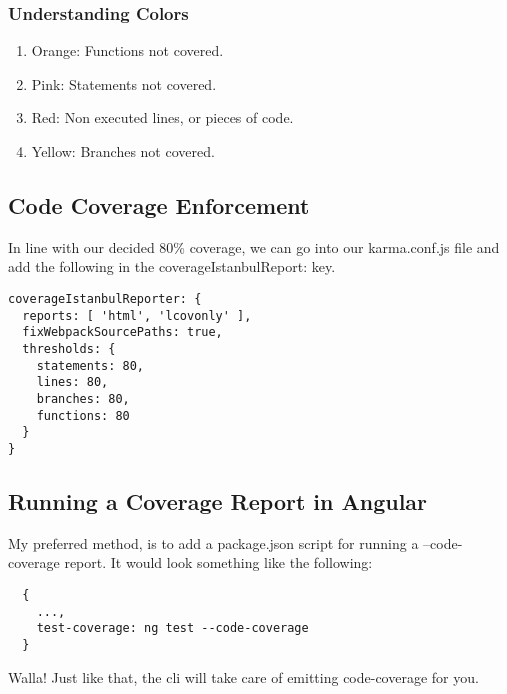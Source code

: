 \subsubsection{Understanding Colors}
\begin{enumerate}
  \item Orange: Functions not covered.
  \item Pink: Statements not covered.
  \item Red: Non executed lines, or pieces of code.
  \item Yellow: Branches not covered.
\end{enumerate}

\subsection{ Code Coverage Enforcement }
In line with our decided 80\% coverage, we can go into our karma.conf.js file
and add the following in the coverageIstanbulReport: key.
\begin{lstlisting}
coverageIstanbulReporter: {
  reports: [ 'html', 'lcovonly' ],
  fixWebpackSourcePaths: true,
  thresholds: {
    statements: 80,
    lines: 80,
    branches: 80,
    functions: 80
  }
}
\end{lstlisting}

\subsection{ Running a Coverage Report in Angular }
My preferred method, is to add a package.json script for running a
--code-coverage report. It would look something like the following:
\begin{verbatim}
  {
    ...,
    test-coverage: ng test --code-coverage
  }
\end{verbatim}

Walla! Just like that, the cli will take care of emitting code-coverage for you.
